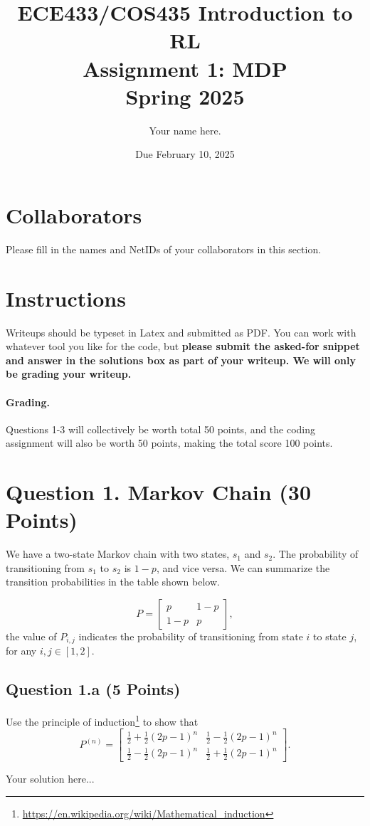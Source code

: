 \documentclass[12pt]{article}
\date{Due February 10, 2025}
\author{\begin{fillme}[width=0.3\textwidth]
 Your name here.
\end{fillme}} %
\title{ECE433/COS435 Introduction to RL\\
  Assignment 1: MDP\\
  Spring 2025\\
}
\begin{document}
  \maketitle
  \section*{Collaborators}
\begin{fillme}
 Please fill in the names and NetIDs of your collaborators in this section.
\end{fillme}

\section*{Instructions}
Writeups should be typeset in Latex and submitted as PDF. You can work with whatever tool you like for the code, but \textbf{please submit the asked-for snippet and answer in the solutions box as part of your writeup. We will only be grading your writeup.}

\paragraph{Grading.} 
Questions 1-3 will collectively be worth total 50 points, and the coding assignment will also be worth 50 points, making the total score 100 points.

\section*{Question 1. Markov Chain (30 Points)}
We have a two-state Markov chain with two states, $s_1$ and $s_2$. The probability of transitioning from $s_1$ to $s_2$ is $1-p$, and vice versa. We can summarize the transition probabilities in the table shown below.

\[
P = \begin{bmatrix}
p & 1 - p \\
1 - p & p 
\end{bmatrix},
\]
the value of $P_{i,j}$ indicates the probability of transitioning from state $i$ to state $j$, for any $i,j \in [1,2]$.

 \subsection*{Question 1.a (5 Points)} Use the principle of induction\footnote{\url{https://en.wikipedia.org/wiki/Mathematical_induction}} to show that
\[
P^{(n)} = \begin{bmatrix}
\frac{1}{2} + \frac{1}{2}(2p - 1)^n & \frac{1}{2} - \frac{1}{2}(2p - 1)^n \\
\frac{1}{2} - \frac{1}{2}(2p - 1)^n & \frac{1}{2} + \frac{1}{2}(2p - 1)^n
\end{bmatrix}.
\]
\begin{solution}
Your solution here...
\end{solution}
\end{document}
